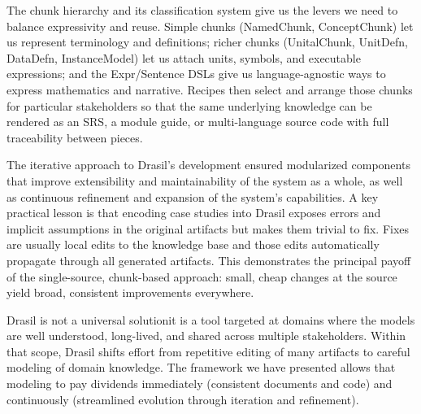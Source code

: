 The chunk hierarchy and its classification system give us the levers we need to 
balance expressivity and reuse. Simple chunks (NamedChunk, ConceptChunk) let us 
represent terminology and definitions; richer chunks (UnitalChunk, UnitDefn, 
DataDefn, InstanceModel) let us attach units, symbols, and executable 
expressions; and the Expr/Sentence DSLs give us 
language-agnostic ways to 
express mathematics and narrative. Recipes then select and arrange those chunks 
for particular stakeholders so that the same underlying knowledge can be 
rendered as an SRS, a module guide, or multi-language source code with full 
traceability between pieces.

The iterative approach to Drasil's development ensured modularized components 
that improve extensibility and maintainability of the system as a whole, as 
well as continuous refinement and expansion of the system's capabilities. A key 
practical lesson is that encoding case studies into Drasil exposes errors 
and implicit assumptions in the original artifacts but makes them trivial to 
fix. Fixes are usually local edits to the knowledge base and those edits 
automatically propagate through all generated artifacts. This demonstrates the 
principal payoff of the single-source, chunk-based approach: small, cheap 
changes at the source yield broad, consistent improvements everywhere.

Drasil is not a universal solution\textemdash{}it is a tool targeted at domains
where the
models are well understood, long-lived, and shared across multiple 
stakeholders. Within that scope, Drasil shifts effort from repetitive editing 
of many artifacts to careful modeling of domain knowledge. The framework we 
have presented allows that modeling to pay dividends immediately (consistent 
documents and code) and continuously (streamlined evolution through iteration 
and refinement).
